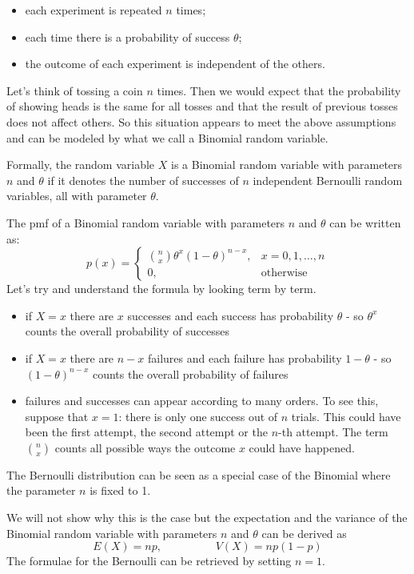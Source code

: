 \documentclass[
]{book}
\theoremstyle{definition}
\theoremstyle{definition}
\theoremstyle{definition}
\theoremstyle{definition}
\theoremstyle{remark}
\begin{document}
\begin{itemize}
\item
  each experiment is repeated \(n\) times;
\item
  each time there is a probability of success \(\theta\);
\item
  the outcome of each experiment is independent of the others.
\end{itemize}

Let's think of tossing a coin \(n\) times. Then we would expect that the probability of showing heads is the same for all tosses and that the result of previous tosses does not affect others. So this situation appears to meet the above assumptions and can be modeled by what we call a Binomial random variable.

Formally, the random variable \(X\) is a Binomial random variable with parameters \(n\) and \(\theta\) if it denotes the number of successes of \(n\) independent Bernoulli random variables, all with parameter \(\theta\).

The pmf of a Binomial random variable with parameters \(n\) and \(\theta\) can be written as:
\[
p(x)=\left\{
\begin{array}{ll}
\binom{n}{x}\theta^{x}(1-\theta)^{n-x}, & x = 0,1,\dots,n\\
0, & \mbox{otherwise}
\end{array}
\right.
\]
Let's try and understand the formula by looking term by term.

\begin{itemize}
\item
  if \(X=x\) there are \(x\) successes and each success has probability \(\theta\) - so \(\theta^x\) counts the overall probability of successes
\item
  if \(X=x\) there are \(n-x\) failures and each failure has probability \(1-\theta\) - so \((1-\theta)^{n-x}\) counts the overall probability of failures
\item
  failures and successes can appear according to many orders. To see this, suppose that \(x=1\): there is only one success out of \(n\) trials. This could have been the first attempt, the second attempt or the \(n\)-th attempt. The term \(\binom{n}{x}\) counts all possible ways the outcome \(x\) could have happened.
\end{itemize}

The Bernoulli distribution can be seen as a special case of the Binomial where the parameter \(n\) is fixed to 1.

We will not show why this is the case but the expectation and the variance of the Binomial random variable with parameters \(n\) and \(\theta\) can be derived as
\[
E(X)=np, \hspace{2cm} V(X)=np(1-p)
\]
The formulae for the Bernoulli can be retrieved by setting \(n=1\).
\end{document}
